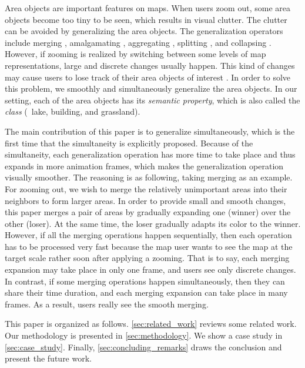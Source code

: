 \documentclass[twocolumn]{svjour3}          %
\begin{document}
Area objects are important features on maps. 
When users zoom out,
some area objects become too tiny to be seen,
which results in visual clutter.
The clutter can be avoided by generalizing the 
area objects.
The generalization operators include
merging \citep[\eg][]{HaunertWolff2010AreaAgg}, 
amalgamating \citep[\eg][]{Ware1995Areal}, 
aggregating \citep[\eg][]{Peng2017Building}, 
splitting \citep[\eg][]{Meijers2016Split}, 
and collapsing \citep[\eg][]{Haunert2008Skeleton}.
However, if zooming is realized by switching between
some levels of map representations, 
large and discrete changes usually happen.
This kind of changes may cause users to lose track of
their area objects of interest \citep{vanKreveld2001}.
In order to solve this problem, 
we smoothly and simultaneously generalize the area objects.
In our setting, each of the area objects has its \emph{semantic property},
which is also called the \emph{class} (\eg\ lake, building, and grassland).


The main contribution of this paper is 
to generalize simultaneously,
which is the first time that the simultaneity is explicitly proposed.
Because of the simultaneity,
each generalization operation has more time to take place
and thus expands in more animation frames,
which makes the generalization operation visually smoother.
The reasoning is as following, taking merging as an example.
For zooming out, we wish to merge the relatively unimportant areas into 
their neighbors to form larger areas.
In order to provide small and smooth changes,
this paper merges a pair of areas by gradually expanding one
(winner) over the other (loser).
At the same time, the loser gradually adapts its color to the winner.
However, if all the merging operations happen sequentially,
then each operation has to be processed very fast 
because the map user wants to see the map at the target scale 
rather soon after applying a zooming.
That is to say, each merging expansion may take place in only one frame,
and users see only discrete changes.
In contrast, if some merging operations happen simultaneously,
then they can share their time duration,
and each merging expansion can take place in many frames.
As a result, users really see the smooth merging.


This paper is organized as follows.
\sect\ref{sec:related_work} reviews some related work.
Our methodology is presented in \sect\ref{sec:methodology}.
We show a case study in \sect\ref{sec:case_study}.
Finally, \sect\ref{sec:concluding_remarks} draws the conclusion
and present the future work.
\end{document}
